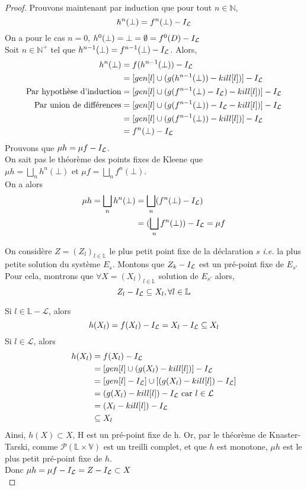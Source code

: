 \documentclass[a4paper, 10pt]{article}
\begin{document}
\begin{proof}
	\noindent
	Prouvons maintenant par induction que pour tout $n \in \mathbb{N}$, 
	\[h^n(\bot) = f^n(\bot) - I_{\mathcal{L}}\]
	On a pour le cas $n=0$, $h^0(\bot) = \bot = \emptyset = f^0(D) - I_{\mathcal{L}}$
	\\
	Soit $n \in \mathbb{N}^+$ tel que $h^{n-1}(\bot) = f^{n-1}(\bot) - I_{\mathcal{L}}$.
	Alors, 
	\begin{align*}
		h^n(\bot) &= f(h^{n-1}(\bot)) - I_{\mathcal{L}}\\
		&= [gen[l] \cup (g(h^{n-1}(\bot)) - kill[l])] - I_{\mathcal{L}}\\
		\text{Par hypothèse d'induction} &= [gen[l] \cup (g(f^{n-1}(\bot) - I_{\mathcal{L}}) - kill[l])] - I_{\mathcal{L}} \\
		\text{Par union de différences} &= [gen[l] \cup (g(f^{n-1}(\bot)) - I_{\mathcal{L}} - kill[l])] - I_{\mathcal{L}} \\
		&= [gen[l] \cup (g(f^{n-1}(\bot)) - kill[l])] - I_{\mathcal{L}} \\
		&= f^n(\bot) - I_{\mathcal{L}}
	\end{align*}
	Prouvons que $\mu{}h = \mu{}f - I_{\mathcal{L}}$.
	\\
	On sait pas le théorème des points fixes de Kleene que
	\\
	$\mu{}h = \bigsqcup_{n}h^n(\bot)$ et $\mu{}f = \bigsqcup_{n}f^n(\bot)$.
	\\
	On a alors 
	\begin{align*}
		\mu{}h = \bigsqcup_{n}h^n(\bot) &= \bigsqcup_{n}(f^n(\bot) - I_{\mathcal{L}})\\
		&= (\bigsqcup_{n}f^n(\bot)) - I_{\mathcal{L}} = \mu{}f
	\end{align*}

	On considère $Z = (Z_l)_{l\in \mathbb{L}}$ le plus petit point fixe de la déclaration $s$ \textit{i.e.} la plus petite solution du système $E_s$.
	Montons que $Z_k - I_{\mathcal{L}}$ est un pré-point fixe de $E_{s'}$\\
	Pour cela, montrons que $\forall X = (X_l)_{l\in \mathbb{L}}$ solution de $E_{s'}$ alors,
	\[Z_l - I_{\mathcal{L}} \subseteq X_l, \forall l \in \mathbb{L}\]

	Si $l \in \mathbb{L} -  \mathcal{L}$, alors 
	\[h(X_l) = f(X_l) - I_{\mathcal{L}} = X_l - I_{\mathcal{L}} \subseteq X_l\]
	Si $l \in \mathcal{L}$, alors
	\begin{align*}
		h(X_l) &= f(X_l) - I_{\mathcal{L}}\\
		&= [gen[l] \cup (g(X_l) - kill[l])] - I_{\mathcal{L}}\\
		&= [gen[l] - I_{\mathcal{L}}] \cup [(g(X_l) - kill[l]) - I_{\mathcal{L}}]\\
		&= (g(X_l) - kill[l]) - I_{\mathcal{L}} \text{ car }l \in \mathcal{L}\\
		&= (X_l - kill[l]) - I_{\mathcal{L}}\\
		&\subseteq X_l
	\end{align*}
	Ainsi, $h(X) \subset X$, H est un pré-point fixe de h.
	Or, par le théorème de Knaster-Tarski, comme $\mathcal{P}(\mathbb{L} \times \mathbb{V})$ est un treilli complet, et que $h$ est monotone, $\mu{}h$ est le plus petit pré-point fixe de $h$.\\
	Donc $\mu{}h = \mu{}f - I_{\mathcal{L}} = Z - I_{\mathcal{L}} \subset X$\\


\end{proof}
\end{document}
